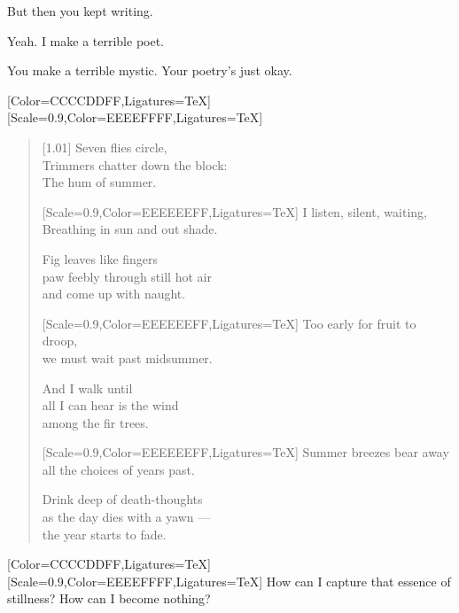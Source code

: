 \begin{paracol}{2}
\begin{leftcolumn}
\begin{ally}
But then you kept writing.
\end{ally}
Yeah. I make a terrible poet.

\begin{ally}
You make a terrible mystic. Your poetry's just okay.
\end{ally}
\newpage

\end{leftcolumn}
\begin{rightcolumn*}
  [Color=CCCCDDFF,Ligatures=TeX]
  \renewfontfamily{}[Scale=0.9,Color=EEEEFFFF,Ligatures=TeX]
  \begin{verse}[1.01\textwidth]
    \small
      Seven flies circle,\\
      Trimmers chatter down the block:\\
      The hum of summer.

      {[Scale=0.9,Color=EEEEEEFF,Ligatures=TeX] \vin I listen, silent, waiting,\\
      \vin Breathing in sun and out shade.}

      Fig leaves like fingers\\
      paw feebly through still hot air\\
      and come up with naught.

      {[Scale=0.9,Color=EEEEEEFF,Ligatures=TeX] \vin Too early for fruit to droop,\\
      \vin we must wait past midsummer.}

      And I walk until\\
      all I can hear is the wind\\
      among the fir trees.

      {[Scale=0.9,Color=EEEEEEFF,Ligatures=TeX] \vin Summer breezes bear away\\
      \vin all the choices of years past.}

      Drink deep of death-thoughts\\
      as the day dies with a yawn ---\\
      the year starts to fade.
    \end{verse}
\end{rightcolumn*}
\begin{leftcolumn}
  [Color=CCCCDDFF,Ligatures=TeX]
  \renewfontfamily{}[Scale=0.9,Color=EEEEFFFF,Ligatures=TeX]
\noindent How can I capture that essence of stillness? How can I become nothing?


\end{leftcolumn}
\end{paracol}
